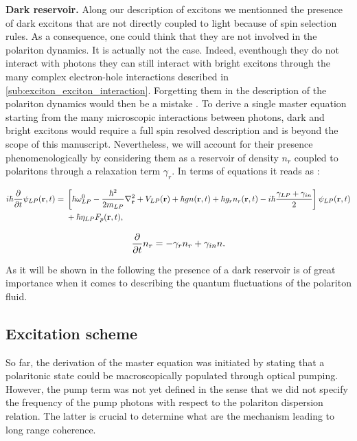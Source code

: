 \textbf{Dark reservoir. }Along our description of excitons we mentionned the presence of dark excitons that are not directly coupled to light because of spin selection rules. As a consequence, one could think 
that they are not involved in the polariton dynamics. It is actually not the case. Indeed, eventhough they do not interact with photons they can still interact with bright excitons through the many complex electron-hole interactions described in \autoref{sub:exciton_exciton_interaction}.
Forgetting them in the description of the polariton dynamics would then be a mistake \cite{Menard2014, stepanov_dispersion_2019}. To derive a single master equation starting from the many microscopic interactions between photons, dark and bright excitons would require a full spin resolved description and is beyond the scope of this manuscript.
Nevertheless, we will account for their presence phenomenologically by considering them as a reservoir of density $n_r$ coupled to polaritons through a relaxation term $\gamma_{r}$. In terms of equations it reads as :


\begin{align}
    \begin{split}
        i \hbar \dfrac{\partial}{\partial t} \psi_{LP}(\mathbf{r}, t) ={}& \left[ \hbar \omega_{LP}^0 -\dfrac{\hbar^2}{2 m_{LP}}\nabla_{\mathbf{r}}^2 + V_{LP}(\mathbf{r}) + \hbar g n(\mathbf{r}, t) + \hbar g_r n_r(\mathbf{r}, t) - i \hbar \dfrac{\gamma_{LP} + \gamma_{in}}{2} \right] \psi_{LP}(\mathbf{r}, t)  \\&+ \hbar \eta_{LP} F_p(\mathbf{r}, t),
    \end{split}
    \end{align}
    
    \begin{equation}
         \dfrac{\partial}{\partial t} n_r = -\gamma_r n_r + \gamma_{in} n.
         \label{reservoir_eq}
    \end{equation}

As it will be shown in the following the presence of a dark reservoir is of great importance when it comes to describing the quantum fluctuations of the polariton fluid.


\subsection{Excitation scheme} So far, the derivation of the master equation was initiated by stating that a polaritonic state could be macroscopically populated 
through optical pumping. However, the pump term was not yet defined in the sense that we did not specify the frequency of the pump photons with respect to the polariton dispersion relation.
The latter is crucial to determine what are the mechanism leading to long range coherence. 

